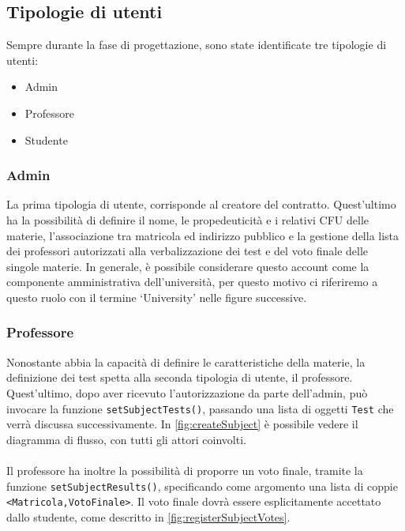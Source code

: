 \subsection{Tipologie di utenti}
\label{sec:roles}
Sempre durante la fase di progettazione, sono state identificate tre tipologie di utenti:
\begin{itemize}
    \item Admin
    \item Professore
    \item Studente
\end{itemize}

\subsubsection{Admin}
La prima tipologia di utente, corrisponde al creatore del contratto. Quest'ultimo ha la possibilità di definire il nome, le propedeuticità e i relativi CFU delle materie, l'associazione tra matricola ed indirizzo pubblico e la gestione della lista dei professori autorizzati alla verbalizzazione dei test e del voto finale delle singole materie. In generale, è possibile considerare questo account come la componente amministrativa dell'università, per questo motivo ci riferiremo a questo ruolo con il termine `University' nelle figure successive.

\subsubsection{Professore}
Nonostante abbia la capacità di definire le caratteristiche della materie, la definizione dei test spetta alla seconda tipologia di utente, il professore.
Quest'ultimo, dopo aver ricevuto l'autorizzazione da parte dell'admin, può invocare la funzione \texttt{setSubjectTests()}, passando una lista di oggetti \texttt{Test} che verrà discussa successivamente. In \autoref{fig:createSubject} è possibile vedere il diagramma di flusso, con tutti gli attori coinvolti.\\
\\
Il professore ha inoltre la possibilità di proporre un voto finale, tramite la funzione \texttt{setSubjectResults()}, specificando come argomento una lista di coppie \texttt{<Matricola,VotoFinale>}. Il voto finale dovrà essere esplicitamente accettato dallo studente, come descritto in \autoref{fig:registerSubjectVotes}.

